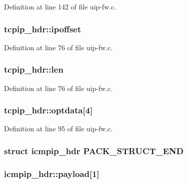 Definition at line 142 of file uip-\/fw.c.

\hypertarget{group__uipfw_ga6d792a078604a9fdef0145b296233661}{
\subsubsection[{ipoffset}]{ {\bf tcpip\_\-hdr::ipoffset}}}
\label{group__uipfw_ga6d792a078604a9fdef0145b296233661}


Definition at line 76 of file uip-\/fw.c.

\hypertarget{group__uipfw_ga79d2ddae647ea9bfd665465b1c703f46}{
\subsubsection[{len}]{ {\bf tcpip\_\-hdr::len}}}
\label{group__uipfw_ga79d2ddae647ea9bfd665465b1c703f46}


Definition at line 76 of file uip-\/fw.c.

\hypertarget{group__uipfw_ga1db8d3a6459a09cd08315c3d131ac982}{
\subsubsection[{optdata}]{ {\bf tcpip\_\-hdr::optdata}\mbox{[}4\mbox{]}}}
\label{group__uipfw_ga1db8d3a6459a09cd08315c3d131ac982}


Definition at line 95 of file uip-\/fw.c.

\hypertarget{group__uipfw_gafe7e75cc45d2b325aaaf5d0042e8bfd8}{
\subsubsection[{PACK\_\-STRUCT\_\-END}]{\setlength{\rightskip}{0pt plus 5cm}struct {\bf icmpip\_\-hdr}  {\bf PACK\_\-STRUCT\_\-END}}}
\label{group__uipfw_gafe7e75cc45d2b325aaaf5d0042e8bfd8}
\hypertarget{group__uipfw_gaba8a72b0f9274932f6880c95165cb30d}{
\subsubsection[{payload}]{ {\bf icmpip\_\-hdr::payload}\mbox{[}1\mbox{]}}}
\label{group__uipfw_gaba8a72b0f9274932f6880c95165cb30d}


